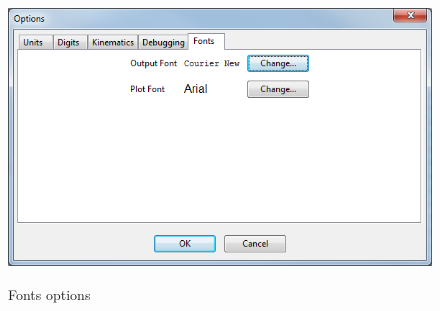 \begin{figure}
\includegraphics[width=\textwidth]{images/optionsFonts} \label{fig:optionsFonts}
\caption{Fonts options}
\centering
\end{figure}